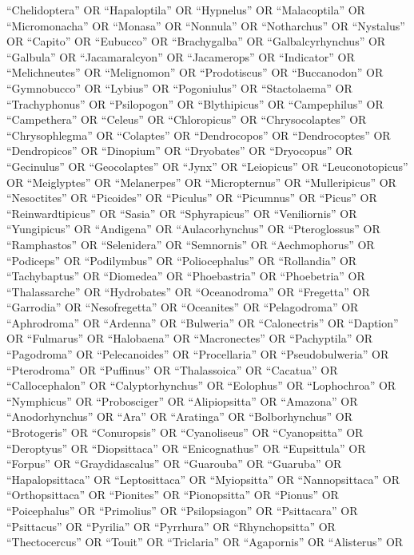 \documentclass[
  number,
  review,
  onecolumn]{elsarticle}
\begin{document}
``Chelidoptera'' OR ``Hapaloptila'' OR ``Hypnelus'' OR ``Malacoptila''
OR ``Micromonacha'' OR ``Monasa'' OR ``Nonnula'' OR ``Notharchus'' OR
``Nystalus'' OR ``Capito'' OR ``Eubucco'' OR ``Brachygalba'' OR
``Galbalcyrhynchus'' OR ``Galbula'' OR ``Jacamaralcyon'' OR
``Jacamerops'' OR ``Indicator'' OR ``Melichneutes'' OR ``Melignomon'' OR
``Prodotiscus'' OR ``Buccanodon'' OR ``Gymnobucco'' OR ``Lybius'' OR
``Pogoniulus'' OR ``Stactolaema'' OR ``Trachyphonus'' OR ``Psilopogon''
OR ``Blythipicus'' OR ``Campephilus'' OR ``Campethera'' OR ``Celeus'' OR
``Chloropicus'' OR ``Chrysocolaptes'' OR ``Chrysophlegma'' OR
``Colaptes'' OR ``Dendrocopos'' OR ``Dendrocoptes'' OR ``Dendropicos''
OR ``Dinopium'' OR ``Dryobates'' OR ``Dryocopus'' OR ``Gecinulus'' OR
``Geocolaptes'' OR ``Jynx'' OR ``Leiopicus'' OR ``Leuconotopicus'' OR
``Meiglyptes'' OR ``Melanerpes'' OR ``Micropternus'' OR ``Mulleripicus''
OR ``Nesoctites'' OR ``Picoides'' OR ``Piculus'' OR ``Picumnus'' OR
``Picus'' OR ``Reinwardtipicus'' OR ``Sasia'' OR ``Sphyrapicus'' OR
``Veniliornis'' OR ``Yungipicus'' OR ``Andigena'' OR ``Aulacorhynchus''
OR ``Pteroglossus'' OR ``Ramphastos'' OR ``Selenidera'' OR ``Semnornis''
OR ``Aechmophorus'' OR ``Podiceps'' OR ``Podilymbus'' OR
``Poliocephalus'' OR ``Rollandia'' OR ``Tachybaptus'' OR ``Diomedea'' OR
``Phoebastria'' OR ``Phoebetria'' OR ``Thalassarche'' OR ``Hydrobates''
OR ``Oceanodroma'' OR ``Fregetta'' OR ``Garrodia'' OR ``Nesofregetta''
OR ``Oceanites'' OR ``Pelagodroma'' OR ``Aphrodroma'' OR ``Ardenna'' OR
``Bulweria'' OR ``Calonectris'' OR ``Daption'' OR ``Fulmarus'' OR
``Halobaena'' OR ``Macronectes'' OR ``Pachyptila'' OR ``Pagodroma'' OR
``Pelecanoides'' OR ``Procellaria'' OR ``Pseudobulweria'' OR
``Pterodroma'' OR ``Puffinus'' OR ``Thalassoica'' OR ``Cacatua'' OR
``Callocephalon'' OR ``Calyptorhynchus'' OR ``Eolophus'' OR
``Lophochroa'' OR ``Nymphicus'' OR ``Probosciger'' OR ``Alipiopsitta''
OR ``Amazona'' OR ``Anodorhynchus'' OR ``Ara'' OR ``Aratinga'' OR
``Bolborhynchus'' OR ``Brotogeris'' OR ``Conuropsis'' OR ``Cyanoliseus''
OR ``Cyanopsitta'' OR ``Deroptyus'' OR ``Diopsittaca'' OR
``Enicognathus'' OR ``Eupsittula'' OR ``Forpus'' OR ``Graydidascalus''
OR ``Guarouba'' OR ``Guaruba'' OR ``Hapalopsittaca'' OR ``Leptosittaca''
OR ``Myiopsitta'' OR ``Nannopsittaca'' OR ``Orthopsittaca'' OR
``Pionites'' OR ``Pionopsitta'' OR ``Pionus'' OR ``Poicephalus'' OR
``Primolius'' OR ``Psilopsiagon'' OR ``Psittacara'' OR ``Psittacus'' OR
``Pyrilia'' OR ``Pyrrhura'' OR ``Rhynchopsitta'' OR ``Thectocercus'' OR
``Touit'' OR ``Triclaria'' OR ``Agapornis'' OR ``Alisterus'' OR
\end{document}
